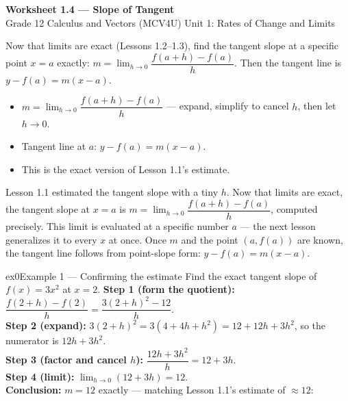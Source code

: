 \documentclass[11pt]{article}
\begin{document}
\begin{center}
{\LARGE\bfseries\color{titleblue}Worksheet 1.4 --- Slope of Tangent}\\[2pt]
{\small Grade 12 Calculus and Vectors (MCV4U) \textperiodcentered{} Unit 1: Rates of Change and Limits}
\end{center}

\begin{ideabox}
Now that limits are exact (Lessons 1.2--1.3), find the tangent slope at a specific point $x=a$ exactly: $m=\displaystyle\lim_{h\to0}\dfrac{f(a+h)-f(a)}{h}$. Then the tangent line is $y-f(a)=m(x-a)$.
\begin{itemize}[leftmargin=*,itemsep=2pt]
  \item $m=\displaystyle\lim_{h\to0}\dfrac{f(a+h)-f(a)}{h}$ --- expand, simplify to cancel $h$, then let $h\to0$.
  \item Tangent line at $a$: $y-f(a)=m(x-a)$.
  \item This is the exact version of Lesson 1.1's estimate.
\end{itemize}
\end{ideabox}

\begin{learnbox}
Lesson 1.1 estimated the tangent slope with a tiny $h$. Now that limits are exact, the tangent slope at $x=a$ is $m=\displaystyle\lim_{h\to0}\dfrac{f(a+h)-f(a)}{h}$, computed precisely.
This limit is evaluated at a specific number $a$ — the next lesson generalizes it to every $x$ at once.
Once $m$ and the point $(a,f(a))$ are known, the tangent line follows from point-slope form: $y-f(a)=m(x-a)$.
\end{learnbox}


\begin{example}{ex0}{Example 1 --- Confirming the estimate}
Find the exact tangent slope of $f(x)=3x^2$ at $x=2$.\soln
\textbf{Step 1 (form the quotient):} $\dfrac{f(2+h)-f(2)}{h}=\dfrac{3(2+h)^2-12}{h}$.\\[3pt]
\textbf{Step 2 (expand):} $3(2+h)^2=3(4+4h+h^2)=12+12h+3h^2$, so the numerator is $12h+3h^2$.\\[3pt]
\textbf{Step 3 (factor and cancel $h$):} $\dfrac{12h+3h^2}{h}=12+3h$.\\[3pt]
\textbf{Step 4 (limit):} $\lim_{h\to0}(12+3h)=12$.\\[3pt]
\textbf{Conclusion:} $m=12$ exactly --- matching Lesson 1.1's estimate of $\approx12$:
\end{example}
\end{document}

